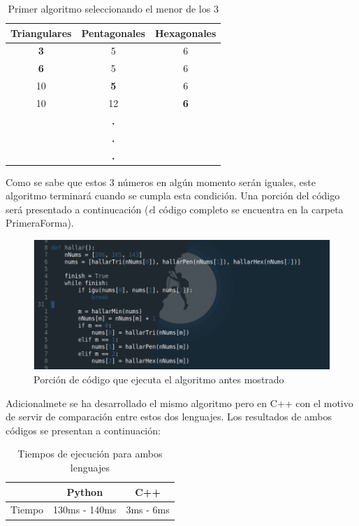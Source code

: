 \documentclass[12pt]{article}
\begin{document}
\begin{table}[H]
   \centering
   \begin{tabular}{ccc}
      Triangulares & Pentagonales & Hexagonales\\
      \hline
      {\textbf 3} & 5 & 6\\
      {\textbf 6} & 5 & 6\\
      10 & {\textbf 5} & 6\\
      10 & 12 & {\textbf 6}\\
      & {\textbf .} &\\
      & {\textbf .} &\\
      & {\textbf .} &\\
   \end{tabular}
   \caption{Primer algoritmo seleccionando el menor de los 3}
\end{table}

Como se sabe que estos 3 números en algún momento serán iguales, este algoritmo terminará cuando se cumpla esta condición.
Una porción del código será presentado a continucación ({\textit el código completo se encuentra en la carpeta PrimeraForma}).

\begin{figure}[H]
   \centering
   \includegraphics[width=\columnwidth]{img/primerCod}
   \caption{Porción de código que ejecuta el algoritmo antes mostrado}
\end{figure}

Adicionalmete se ha desarrollado el mismo algoritmo pero en C++ con el motivo de servir de comparación entre estos dos
lenguajes. Los resultados de ambos códigos se presentan a continuación:

\begin{table}[H]
   \centering
   \caption{Tiempos de ejecución para ambos lenguajes}
   \begin{tabular}{ccc}
      & Python & C++\\
      \hline
      Tiempo & 130ms - 140ms & 3ms - 6ms\\
   \end{tabular}
\end{table}
\end{document}
